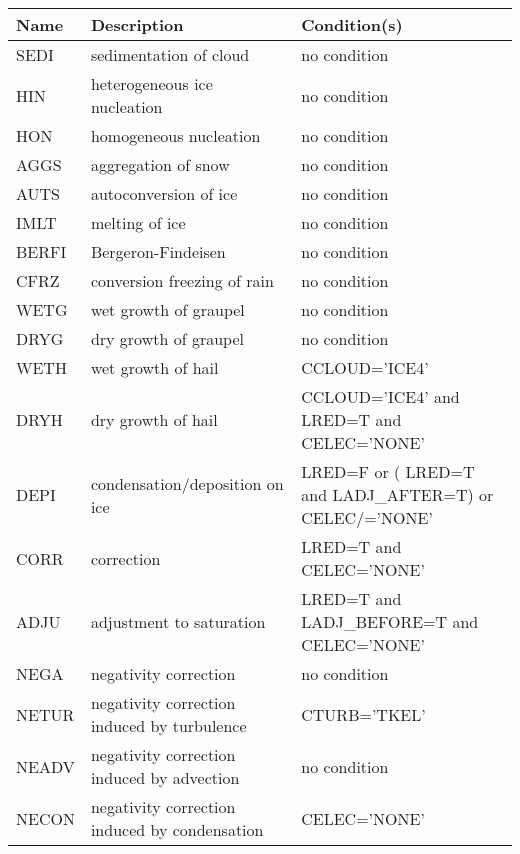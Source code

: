 \begin{longtable} {|p{}|p{}|p{}|}
\hline
Name & Description & Condition(s) \\
\hline \hline
\endhead
SEDI   & sedimentation of cloud                        & no condition \\\hline
HIN    & heterogeneous ice nucleation                  & no condition \\\hline
HON    & homogeneous nucleation                        & no condition \\\hline
AGGS   & aggregation of snow                           & no condition \\\hline
AUTS   & autoconversion of ice                         & no condition \\\hline
IMLT   & melting of ice                                & no condition \\\hline
BERFI  & Bergeron-Findeisen                            & no condition \\\hline
CFRZ   & conversion freezing of rain                   & no condition \\\hline
WETG   & wet growth of graupel                         & no condition \\\hline
DRYG   & dry growth of graupel                         & no condition \\\hline
WETH   & wet growth of hail                            & CCLOUD='ICE4' \\\hline
DRYH   & dry growth of hail                            & CCLOUD='ICE4' and LRED=T and CELEC='NONE' \\\hline
DEPI   & condensation/deposition on ice                & LRED=F or ( LRED=T and LADJ\_AFTER=T) or CELEC/='NONE' \\\hline
CORR   & correction                                    & LRED=T and CELEC='NONE' \\\hline
ADJU   & adjustment to saturation                      & LRED=T and LADJ\_BEFORE=T and CELEC='NONE' \\\hline
NEGA   & negativity correction                         & no condition \\\hline
NETUR  & negativity correction induced by turbulence   & CTURB='TKEL' \\\hline
NEADV  & negativity correction induced by advection    & no condition \\\hline
NECON  & negativity correction induced by condensation & CELEC='NONE' \\\hline
\end{longtable}


